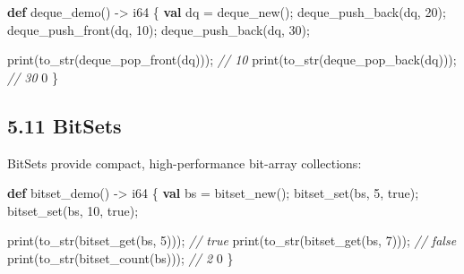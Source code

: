 \documentclass[
  english,
]{book}
\newenvironment{Shaded}{\begin{snugshade}}{\end{snugshade}}
\newcommand{\CommentTok}[1]{\textcolor[rgb]{0.42,0.60,0.33}{\textit{#1}}}
\newcommand{\ConstantTok}[1]{\textcolor[rgb]{0.31,0.76,1.00}{#1}}
\newcommand{\DataTypeTok}[1]{\textcolor[rgb]{0.31,0.79,0.69}{#1}}
\newcommand{\DecValTok}[1]{\textcolor[rgb]{0.71,0.81,0.66}{#1}}
\newcommand{\FunctionTok}[1]{\textcolor[rgb]{0.86,0.86,0.67}{#1}}
\newcommand{\KeywordTok}[1]{\textcolor[rgb]{0.34,0.61,0.84}{\textbf{#1}}}
\newcommand{\NormalTok}[1]{\textcolor[rgb]{0.83,0.83,0.83}{#1}}
\newcommand{\OperatorTok}[1]{\textcolor[rgb]{0.83,0.83,0.83}{#1}}
\begin{document}
\begin{Shaded}
\begin{Highlighting}[]
\KeywordTok{def}\NormalTok{ deque\_demo() }\OperatorTok{{-}\textgreater{}} \DataTypeTok{i64}\NormalTok{ \{}
    \KeywordTok{val}\NormalTok{ dq }\OperatorTok{=} \FunctionTok{deque\_new}\NormalTok{();}
    \FunctionTok{deque\_push\_back}\NormalTok{(dq, }\DecValTok{20}\NormalTok{);}
    \FunctionTok{deque\_push\_front}\NormalTok{(dq, }\DecValTok{10}\NormalTok{);}
    \FunctionTok{deque\_push\_back}\NormalTok{(dq, }\DecValTok{30}\NormalTok{);}
    
    \FunctionTok{print}\NormalTok{(}\FunctionTok{to\_str}\NormalTok{(}\FunctionTok{deque\_pop\_front}\NormalTok{(dq))); }\CommentTok{// 10}
    \FunctionTok{print}\NormalTok{(}\FunctionTok{to\_str}\NormalTok{(}\FunctionTok{deque\_pop\_back}\NormalTok{(dq)));  }\CommentTok{// 30}
    \DecValTok{0}
\NormalTok{\}}
\end{Highlighting}
\end{Shaded}

\subsection{5.11 BitSets}\label{bitsets}

BitSets provide compact, high-performance bit-array collections:

\begin{Shaded}
\begin{Highlighting}[]
\KeywordTok{def}\NormalTok{ bitset\_demo() }\OperatorTok{{-}\textgreater{}} \DataTypeTok{i64}\NormalTok{ \{}
    \KeywordTok{val}\NormalTok{ bs }\OperatorTok{=} \FunctionTok{bitset\_new}\NormalTok{();}
    \FunctionTok{bitset\_set}\NormalTok{(bs, }\DecValTok{5}\NormalTok{, }\ConstantTok{true}\NormalTok{);}
    \FunctionTok{bitset\_set}\NormalTok{(bs, }\DecValTok{10}\NormalTok{, }\ConstantTok{true}\NormalTok{);}
    
    \FunctionTok{print}\NormalTok{(}\FunctionTok{to\_str}\NormalTok{(}\FunctionTok{bitset\_get}\NormalTok{(bs, }\DecValTok{5}\NormalTok{)));   }\CommentTok{// true}
    \FunctionTok{print}\NormalTok{(}\FunctionTok{to\_str}\NormalTok{(}\FunctionTok{bitset\_get}\NormalTok{(bs, }\DecValTok{7}\NormalTok{)));   }\CommentTok{// false}
    \FunctionTok{print}\NormalTok{(}\FunctionTok{to\_str}\NormalTok{(}\FunctionTok{bitset\_count}\NormalTok{(bs)));    }\CommentTok{// 2}
    \DecValTok{0}
\NormalTok{\}}
\end{Highlighting}
\end{Shaded}
\end{document}
